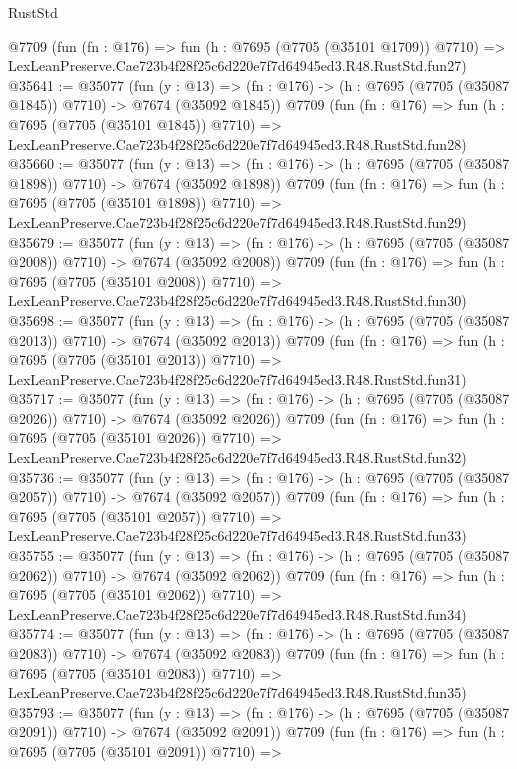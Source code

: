 \begin{lexlean}{RustStd}
\begin{coremodule}
    @7709
    (fun (fn : @176) =>
    fun (h : @7695 (@7705 (@35101 @1709)) @7710) =>
    LexLeanPreserve.Cae723b4f28f25c6d220e7f7d64945ed3.R48.RustStd.fun27)
@35641 := @35077
    (fun (y : @13) =>
    (fn : @176) -> (h : @7695 (@7705 (@35087 @1845)) @7710) -> @7674 (@35092 @1845))
    @7709
    (fun (fn : @176) =>
    fun (h : @7695 (@7705 (@35101 @1845)) @7710) =>
    LexLeanPreserve.Cae723b4f28f25c6d220e7f7d64945ed3.R48.RustStd.fun28)
@35660 := @35077
    (fun (y : @13) =>
    (fn : @176) -> (h : @7695 (@7705 (@35087 @1898)) @7710) -> @7674 (@35092 @1898))
    @7709
    (fun (fn : @176) =>
    fun (h : @7695 (@7705 (@35101 @1898)) @7710) =>
    LexLeanPreserve.Cae723b4f28f25c6d220e7f7d64945ed3.R48.RustStd.fun29)
@35679 := @35077
    (fun (y : @13) =>
    (fn : @176) -> (h : @7695 (@7705 (@35087 @2008)) @7710) -> @7674 (@35092 @2008))
    @7709
    (fun (fn : @176) =>
    fun (h : @7695 (@7705 (@35101 @2008)) @7710) =>
    LexLeanPreserve.Cae723b4f28f25c6d220e7f7d64945ed3.R48.RustStd.fun30)
@35698 := @35077
    (fun (y : @13) =>
    (fn : @176) -> (h : @7695 (@7705 (@35087 @2013)) @7710) -> @7674 (@35092 @2013))
    @7709
    (fun (fn : @176) =>
    fun (h : @7695 (@7705 (@35101 @2013)) @7710) =>
    LexLeanPreserve.Cae723b4f28f25c6d220e7f7d64945ed3.R48.RustStd.fun31)
@35717 := @35077
    (fun (y : @13) =>
    (fn : @176) -> (h : @7695 (@7705 (@35087 @2026)) @7710) -> @7674 (@35092 @2026))
    @7709
    (fun (fn : @176) =>
    fun (h : @7695 (@7705 (@35101 @2026)) @7710) =>
    LexLeanPreserve.Cae723b4f28f25c6d220e7f7d64945ed3.R48.RustStd.fun32)
@35736 := @35077
    (fun (y : @13) =>
    (fn : @176) -> (h : @7695 (@7705 (@35087 @2057)) @7710) -> @7674 (@35092 @2057))
    @7709
    (fun (fn : @176) =>
    fun (h : @7695 (@7705 (@35101 @2057)) @7710) =>
    LexLeanPreserve.Cae723b4f28f25c6d220e7f7d64945ed3.R48.RustStd.fun33)
@35755 := @35077
    (fun (y : @13) =>
    (fn : @176) -> (h : @7695 (@7705 (@35087 @2062)) @7710) -> @7674 (@35092 @2062))
    @7709
    (fun (fn : @176) =>
    fun (h : @7695 (@7705 (@35101 @2062)) @7710) =>
    LexLeanPreserve.Cae723b4f28f25c6d220e7f7d64945ed3.R48.RustStd.fun34)
@35774 := @35077
    (fun (y : @13) =>
    (fn : @176) -> (h : @7695 (@7705 (@35087 @2083)) @7710) -> @7674 (@35092 @2083))
    @7709
    (fun (fn : @176) =>
    fun (h : @7695 (@7705 (@35101 @2083)) @7710) =>
    LexLeanPreserve.Cae723b4f28f25c6d220e7f7d64945ed3.R48.RustStd.fun35)
@35793 := @35077
    (fun (y : @13) =>
    (fn : @176) -> (h : @7695 (@7705 (@35087 @2091)) @7710) -> @7674 (@35092 @2091))
    @7709
    (fun (fn : @176) =>
    fun (h : @7695 (@7705 (@35101 @2091)) @7710) =>

\end{coremodule}
\end{lexlean}
